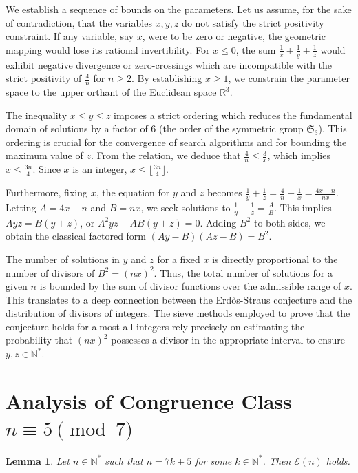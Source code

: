 \documentclass[12pt, a4paper]{article}
\newtheorem{lemma}[theorem]{Lemma}
\theoremstyle{definition}
\theoremstyle{remark}
\begin{document}
We establish a sequence of bounds on the parameters. Let us assume, for the sake of contradiction, that the variables $x, y, z$ do not satisfy the strict positivity constraint. If any variable, say $x$, were to be zero or negative, the geometric mapping would lose its rational invertibility. For $x \le 0$, the sum $\frac{1}{x} + \frac{1}{y} + \frac{1}{z}$ would exhibit negative divergence or zero-crossings which are incompatible with the strict positivity of $\frac{4}{n}$ for $n \ge 2$. By establishing $x \ge 1$, we constrain the parameter space to the upper orthant of the Euclidean space $\mathbb{R}^3$.

The inequality $x \le y \le z$ imposes a strict ordering which reduces the fundamental domain of solutions by a factor of 6 (the order of the symmetric group $\mathfrak{S}_3$). This ordering is crucial for the convergence of search algorithms and for bounding the maximum value of $z$. From the relation, we deduce that $\frac{4}{n} \le \frac{3}{x}$, which implies $x \le \frac{3n}{4}$. Since $x$ is an integer, $x \le \lfloor \frac{3n}{4} \rfloor$.

Furthermore, fixing $x$, the equation for $y$ and $z$ becomes $\frac{1}{y} + \frac{1}{z} = \frac{4}{n} - \frac{1}{x} = \frac{4x - n}{nx}$. Letting $A = 4x - n$ and $B = nx$, we seek solutions to $\frac{1}{y} + \frac{1}{z} = \frac{A}{B}$. This implies $Ayz = B(y+z)$, or $A^2 y z - AB(y+z) = 0$. Adding $B^2$ to both sides, we obtain the classical factored form $(Ay - B)(Az - B) = B^2$.

The number of solutions in $y$ and $z$ for a fixed $x$ is directly proportional to the number of divisors of $B^2 = (nx)^2$. Thus, the total number of solutions for a given $n$ is bounded by the sum of divisor functions over the admissible range of $x$. This translates to a deep connection between the Erd\H{o}s-Straus conjecture and the distribution of divisors of integers. The sieve methods employed to prove that the conjecture holds for almost all integers rely precisely on estimating the probability that $(nx)^2$ possesses a divisor in the appropriate interval to ensure $y, z \in \mathbb{N}^*$.

\section{Analysis of Congruence Class $n \equiv 5 \pmod 7$}

\begin{lemma}
Let $n \in \mathbb{N}^*$ such that $n = 7k + 5$ for some $k \in \mathbb{N}^*$. Then $\mathcal{E}(n)$ holds.
\end{lemma}
\end{document}
